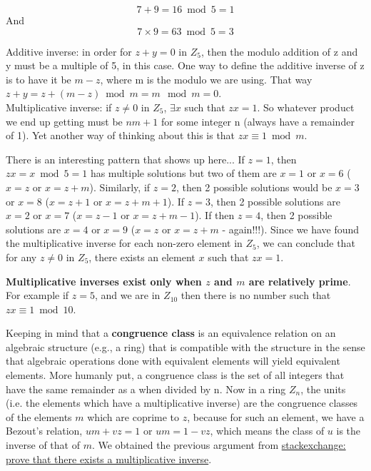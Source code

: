 $$
7+9 = 16 \bmod 5 = 1
$$
And
$$
7\times 9 = 63 \bmod 5 = 3
$$

Additive inverse: in order for $z+y = 0$ in $Z_5$, then the modulo addition of z and y must be a multiple of 5, in this case.
One way to define the additive inverse of z is to have it be $m-z$, where m is the modulo we are using.
That way $z + y = z + (m-z) \bmod m = m \mod m = 0$.
\\

Multiplicative inverse: if $z \neq 0$ in $Z_5$, $\exists x$ such that $zx = 1$.
So whatever product we end up getting must be $nm + 1$ for some integer n (always have a remainder of 1).
Yet another way of thinking about this is that $zx \equiv 1 \bmod m$.

There is an interesting pattern that shows up here...
If $z=1$, then $zx = x \bmod 5 = 1$ has multiple solutions but two of them are $x=1$ or $x=6$ ($x=z$ or $x=z+m$).
Similarly, if $z=2$, then 2 possible solutions would be $x=3$ or $x=8$ ($x=z+1$ or $x=z+m+1$).
If $z=3$, then 2 possible solutions are $x=2$ or $x=7$ ($x=z-1$ or $x=z+m-1$).
If then $z=4$, then 2 possible solutions are $x=4$ or $x=9$ ($x=z$ or $x=z+m$ - again!!!).
Since we have found the multiplicative inverse for each non-zero element in $Z_5$, we can conclude
that for any $z \neq 0$ in $Z_5$, there exists an element $x$ such that $zx = 1$.

\textbf{Multiplicative inverses exist only when $z$ and $m$ are relatively prime}.
For example if $z=5$, and we are in $Z_{10}$ then there is no number such that $zx \equiv 1 \bmod 10$.

Keeping in mind that a \textbf{congruence class} is an equivalence relation on an algebraic structure (e.g., a ring)
that is compatible with the structure in the sense that algebraic operations done with equivalent elements will yield equivalent elements.
More humanly put, a congruence class is the set of all integers that have the same remainder as a when divided by n.
Now in a ring $Z_n$, the units (i.e. the elements which have a multiplicative inverse) are the
congruence classes of the elements $m$ which are coprime to $z$, because for such an element, we have a
Bezout's relation, $um + vz = 1$ or $um = 1 - vz$, which means the class of $u$ is the inverse of that of $m$.
We obtained the previous argument from
\href{https://math.stackexchange.com/questions/2650336/for-z-5-0-1-4-and-z-in-z-n-prove-that-there-exists-a-multiplicative-i}{stackexchange: prove that there exists a multiplicative inverse}.
\\~\\


